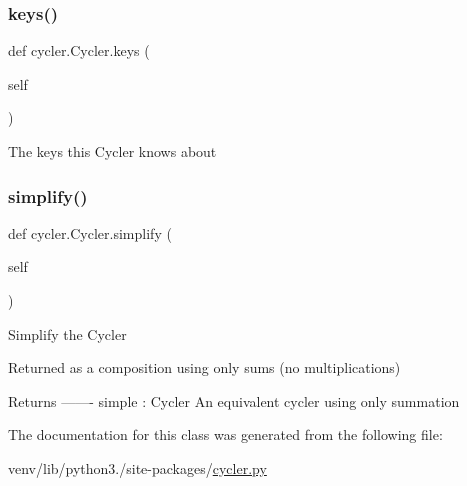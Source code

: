 \subsubsection{\texorpdfstring{keys()}{keys()}}
{\footnotesize\ttfamily def cycler.\+Cycler.\+keys (\begin{DoxyParamCaption}\item[{}]{self }\end{DoxyParamCaption})}

\begin{DoxyVerb}The keys this Cycler knows about
\end{DoxyVerb}
 \mbox{\label{classcycler_1_1Cycler_a0a6e46f7c2b2e5a277e1e8c0b43c96e5}} 
\subsubsection{\texorpdfstring{simplify()}{simplify()}}
{\footnotesize\ttfamily def cycler.\+Cycler.\+simplify (\begin{DoxyParamCaption}\item[{}]{self }\end{DoxyParamCaption})}

\begin{DoxyVerb}Simplify the Cycler

Returned as a composition using only sums (no multiplications)

Returns
-------
simple : Cycler
    An equivalent cycler using only summation\end{DoxyVerb}
 

The documentation for this class was generated from the following file\+:\begin{DoxyCompactItemize}
\item 
venv/lib/python3./site-\/packages/\hyperlink{cycler_8py}{cycler.\+py}\end{DoxyCompactItemize}
